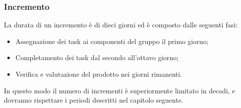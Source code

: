 \subsubsection{Incremento}
\label{inc}

La durata di un incremento è di dieci giorni ed è composto dalle seguenti fasi:
\begin{itemize}
	\item Assegnazione dei task ai componenti del gruppo il primo giorno;
	\item Completamento dei task dal secondo all'ottavo giorno;
	\item Verifica e valutazione del prodotto nei giorni rimanenti.
\end{itemize}

In questo modo il numero di incrementi è superiormente limitato in decadi, e dovranno rispettare i periodi descritti nel capitolo seguente.  